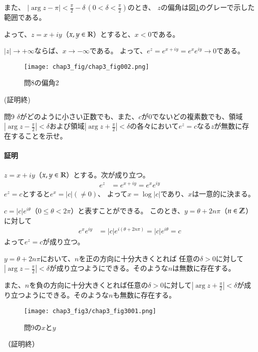 また、
$|\arg z-\pi|<\frac{\pi}{2}-\delta\,(0<\delta<\frac{\pi}{2})$のとき、
$z$の偏角は図\ref{fig:chap3prob8-2}のグレーで示した範囲である。

よって、$z=x+iy$（$x,y\in\mathbb{R}$）とすると、$x<0$である。

$|z|\longrightarrow+\infty$ならば、$x\longrightarrow-\infty$である。
よって、$e^z=e^{x+iy}=e^xe^{iy}\longrightarrow0$である。
\begin{figure}[h]
    \centering
    \texttt{[image: chap3\_fig/chap3\_fig002.png]}
    \caption{問8の偏角2}
    \label{fig:chap3prob8-2}
\end{figure}
(証明終)
\clearpage

\begin{mysimplebox}{問9}
    $\delta$がどのように小さい正数でも、また、$c$が0でないどの複素数でも、領域$|\arg z-\frac{\pi}{2}|<\delta$および領域$|\arg z+\frac{\pi}{2}|<\delta$の各々において$e^z=c$なる$z$が無数に存在することを示せ。
\end{mysimplebox}
\paragraph{証明}
$z=x+iy$（$x,y\in\mathbb{R}$）とする。次が成り立つ。
\begin{align*}
    e^z&=e^{x+iy}=e^xe^{iy}
\end{align*}
$e^z=c$とすると$e^x=|c|(\neq0)$、
よって$x=\log|c|$であり、$x$は一意的に決まる。

$c=|c|e^{i\theta}$（$0\le\theta<2\pi$）と表すことができる。
このとき、$y=\theta+2n\pi$（$n\in\mathbb{Z}$）に対して
\begin{align*}
    e^xe^{iy}&=|c|e^{i(\theta+2n\pi)}=|c|e^{i\theta}=c
\end{align*}
よって$e^z=c$が成り立つ。

$y=\theta+2n\pi$において、$n$を正の方向に十分大きくとれば
任意の$\delta>0$に対して$|\arg z-\frac{\pi}{2}|<\delta$が成り立つようにできる。そのような$n$は無数に存在する。

また、$n$を負の方向に十分大きくとれば任意の$\delta>0$に対して$|\arg z+\frac{\pi}{2}|<\delta$が成り立つようにできる。そのような$n$も無数に存在する。
\begin{figure}[h]
    \centering
    \texttt{[image: chap3\_fig3/chap3\_fig3001.png]}
    \caption{問9の$x$と$y$}
    \label{fig:chap3prob9}
\end{figure}
（証明終）

